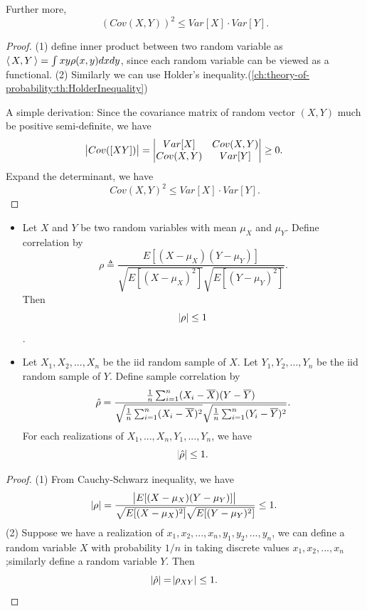 \begin{refsection}
\begin{theorem}
Further more,
$$(Cov(X, Y))^2 \leq Var[X]\cdot Var[Y].$$	
\end{theorem}
\begin{proof}
(1)	define inner product between two random variable as ${\left< \, X,Y \, \right>} = \int xy\rho(x,y)dxdy$, since each random variable can be viewed as a functional. 
(2) Similarly we can use Holder's inequality.(\autoref{ch:theory-of-probability:th:HolderInequality})

A simple derivation:
Since the covariance matrix of random vector $(X, Y)$ much be positive semi-definite, we have
$$\abs{Cov([X Y])} = \begin{vmatrix}
Var[X] & Cov(X,Y) \\
Cov(X,Y) & Var[Y]
\end{vmatrix} \geq 0.$$
Expand the determinant, we have
$$Cov(X,Y)^2 \leq Var[X]\cdot Var[Y].$$
\end{proof}

\begin{corollary}\label{ch:theory-of-probability:th:Cauchy-SchwarzInequalityBoundsOnCorrelations}\hfill
\begin{itemize}
	\item Let $X$ and $Y$ be two random variables with mean $\mu_X$ and $\mu_Y$. Define correlation by
	$$\rho \triangleq \frac{E[(X-\mu_X)(Y-\mu_Y)]}{\sqrt{E[(X-\mu_X)^2]}\sqrt{E[(Y-\mu_Y)^2]}}.$$
	Then $$\abs{\rho} \leq 1$$.
	\item Let $X_1,X_2,...,X_n$ be the iid random sample of $X$. Let $Y_1,Y_2,...,Y_n$ be the iid random sample of $Y$. Define sample correlation by
	$$\hat{\rho} = \frac{\frac{1}{n}\sum_{i=1}^n (X_i - \overline{X})(Y-\overline{Y})}{\sqrt{\frac{1}{n}\sum_{i=1}^n (X_i - \overline{X})^2}\sqrt{\frac{1}{n}\sum_{i=1}^n (Y_i - \overline{Y})^2}}.$$
	For each realizations of $X_1,...,X_n, Y_1,...,Y_n$, we have
	$$\abs{\hat{\rho}}\leq 1. $$		
\end{itemize}	
\end{corollary}
\begin{proof}
(1) From Cauchy-Schwarz inequality, we have
$$\abs{\rho} = \frac{\abs{E[(X-\mu_X)(Y-\mu_Y)]}}{\sqrt{E[(X-\mu_X)^2]}\sqrt{E[(Y-\mu_Y)^2]}} \leq 1.$$
(2) Suppose we have a realization of $x_1,x_2,...,x_n, y_1,y_2,...,y_n$, we can define a random variable $X$ with probability $1/n$ in taking discrete values $x_1,x_2,...,x_n$;similarly define a random variable $Y$.
Then
$$\abs{\hat{\rho}} = \abs{\rho_{XY}} \leq 1.$$
\end{proof}




\end{refsection}
